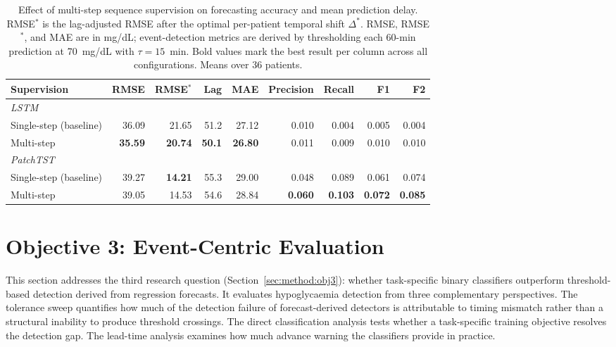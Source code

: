 \begin{table}[tbp]
\centering
\small
\caption{Effect of multi-step sequence supervision on forecasting accuracy and mean prediction delay. RMSE$^*$ is the lag-adjusted RMSE after the optimal per-patient temporal shift $\Delta^*$. RMSE, RMSE$^*$, and MAE are in mg/dL; event-detection metrics are derived by thresholding each 60-min prediction at 70~mg/dL with $\tau = 15$~min. Bold values mark the best result per column across all configurations. Means over 36 patients.}
\label{tab:exp:obj2}
\setlength{\tabcolsep}{3.5pt}
\begin{tabular}{lrrrrrrrr}
\toprule
Supervision & RMSE & RMSE$^*$ & Lag & MAE & Precision & Recall & F1 & F2 \\
\midrule
\multicolumn{9}{l}{\textit{LSTM}} \\[2pt]
Single-step (baseline) & 36.09 & 21.65          & 51.2          & 27.12 & 0.010 & 0.004 & 0.005 & 0.004 \\
Multi-step             & \textbf{35.59} & \textbf{20.74} & \textbf{50.1} & \textbf{26.80} & 0.011 & 0.009 & 0.010 & 0.010 \\
\midrule
\multicolumn{9}{l}{\textit{PatchTST}} \\[2pt]
Single-step (baseline) & 39.27 & \textbf{14.21} & 55.3 & 29.00 & 0.048 & 0.089          & 0.061          & 0.074          \\
Multi-step             & 39.05 & 14.53          & 54.6 & 28.84 & \textbf{0.060} & \textbf{0.103} & \textbf{0.072} & \textbf{0.085} \\
\bottomrule
\end{tabular}
\end{table}

\section{Objective 3: Event-Centric Evaluation} \label{sec:exp:obj3}

This section addresses the third research question (Section~\ref{sec:method:obj3}): whether task-specific binary classifiers outperform threshold-based detection derived from regression forecasts. It evaluates hypoglycaemia detection from three complementary perspectives. The tolerance sweep quantifies how much of the detection failure of forecast-derived detectors is attributable to timing mismatch rather than a structural inability to produce threshold crossings. The direct classification analysis tests whether a task-specific training objective resolves the detection gap. The lead-time analysis examines how much advance warning the classifiers provide in practice.

